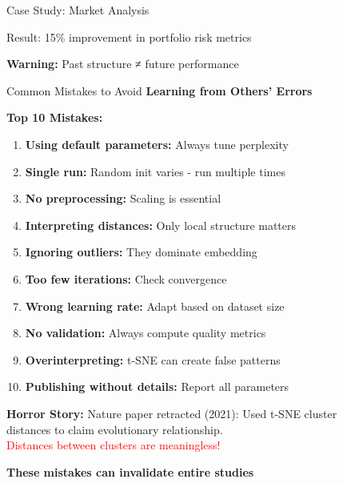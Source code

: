 \documentclass[10pt]{beamer}
\newcommand{\emphtext}[1]{\textcolor{upcblue}{\textbf{#1}}}
\newcommand{\warningbox}[1]{\colorbox{red!10}{\begin{minipage}{0.85\textwidth}\centering #1\end{minipage}}}
\newcommand{\conceptbox}[1]{\colorbox{upcblue!10}{\begin{minipage}{0.85\textwidth}\centering #1\end{minipage}}}
\begin{document}
\begin{frame}{Case Study: Market Analysis}
\vspace{0.3cm}
\begin{center}
\conceptbox{\footnotesize Result: 15\% improvement in portfolio risk metrics}
\end{center}

\begin{center}
\warningbox{\footnotesize\textbf{Warning:} Past structure ≠ future performance}
\end{center}
\end{frame}

\begin{frame}{Common Mistakes to Avoid}
\emphtext{Learning from Others' Errors}

\vspace{0.3cm}
\textbf{Top 10 Mistakes:}

\begin{enumerate}
\footnotesize
\item \textbf{Using default parameters:} Always tune perplexity
\item \textbf{Single run:} Random init varies - run multiple times
\item \textbf{No preprocessing:} Scaling is essential
\item \textbf{Interpreting distances:} Only local structure matters
\item \textbf{Ignoring outliers:} They dominate embedding
\item \textbf{Too few iterations:} Check convergence
\item \textbf{Wrong learning rate:} Adapt based on dataset size
\item \textbf{No validation:} Always compute quality metrics
\item \textbf{Overinterpreting:} t-SNE can create false patterns
\item \textbf{Publishing without details:} Report all parameters
\end{enumerate}

\vspace{0.3cm}
\textbf{Horror Story:}
\footnotesize
Nature paper retracted (2021): Used t-SNE cluster\\
distances to claim evolutionary relationship.\\
\textcolor{red}{Distances between clusters are meaningless!}

\begin{center}
\warningbox{\footnotesize\textbf{These mistakes can invalidate entire studies}}
\end{center}
\end{frame}
\end{document}
